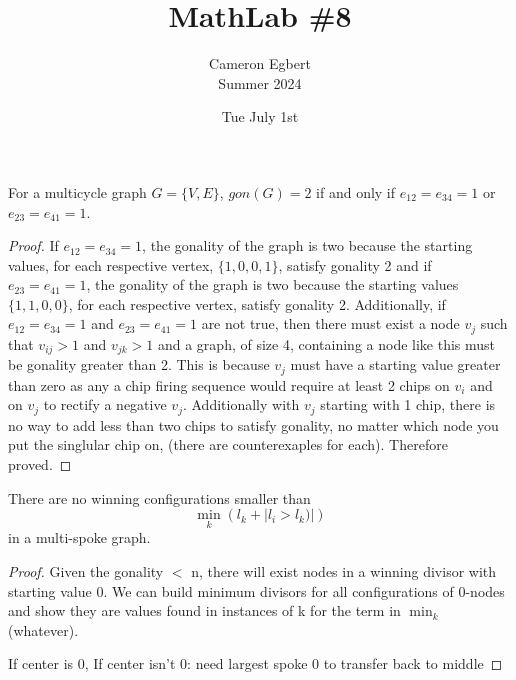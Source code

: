 \documentclass[12pt]{article}
\newenvironment{problem}[2][Problem]{\begin{trivlist}
\item[\hskip \labelsep {\bfseries #1}\hskip \labelsep {\bfseries #2.}]}{\end{trivlist}}
\begin{document}
 
\title{MathLab \#8}
\author{Cameron Egbert\\
Summer 2024}
\date{Tue July 1st}
\maketitle


\begin{problem}{1}
    For a multicycle graph $G = \{V, E\}$, $gon(G) = 2$ if and only if $e_{12}=e_{34}=1$ or $e_{23}=e_{41}=1$.
\end{problem}
\begin{proof}
    If $e_{12}=e_{34}=1$, the gonality of the graph is two because the starting values, for each respective vertex, $\{1, 0, 0, 1\}$, satisfy gonality 2 and if $e_{23}=e_{41}=1$, the gonality of the graph is two because the starting values $\{1, 1, 0, 0\}$, for each respective vertex,  satisfy gonality 2. Additionally, if $e_{12}=e_{34}=1$ and $e_{23}=e_{41}=1$ are not true, then there must exist a node $v_j$ such that $v_{ij} > 1$ and $v_{jk} > 1$ and a graph, of size 4, containing a node like this must be gonality greater than 2. This is because $v_j$ must have a starting value greater than zero as any a chip firing sequence would require at least 2 chips on $v_i$ and on $v_j$ to rectify a negative $v_j$. Additionally with $v_j$ starting with 1 chip, there is no way to add less than two chips to satisfy gonality, no matter which node you put the singlular chip on, (there are counterexaples for each). Therefore proved.
\end{proof}

\begin{problem}{2}
    There are no winning configurations smaller than 
    \[
        \min_{k} (l_k + |l_i > l_k)|)
    \] 
    in a multi-spoke graph.
\end{problem}
\begin{proof}


    
    Given the gonality $<$ n, there will exist nodes in a winning divisor with starting value 0. We can build minimum divisors for all configurations of 0-nodes and show they are values found in instances of k for the term in $\min_{k}$ (whatever).

    If center is 0, 
    If center isn't 0: need largest spoke 0 to transfer back to middle
    
\end{proof}
\end{document}

